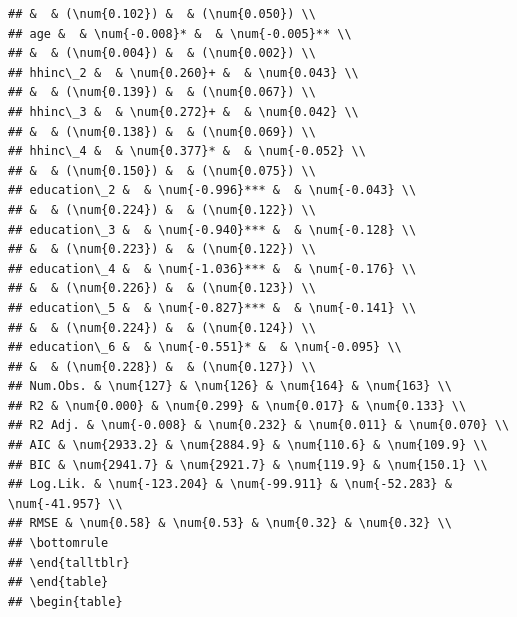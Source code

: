 \documentclass[
]{article}
\begin{document}
\begin{verbatim}
## &  & (\num{0.102}) &  & (\num{0.050}) \\
## age &  & \num{-0.008}* &  & \num{-0.005}** \\
## &  & (\num{0.004}) &  & (\num{0.002}) \\
## hhinc\_2 &  & \num{0.260}+ &  & \num{0.043} \\
## &  & (\num{0.139}) &  & (\num{0.067}) \\
## hhinc\_3 &  & \num{0.272}+ &  & \num{0.042} \\
## &  & (\num{0.138}) &  & (\num{0.069}) \\
## hhinc\_4 &  & \num{0.377}* &  & \num{-0.052} \\
## &  & (\num{0.150}) &  & (\num{0.075}) \\
## education\_2 &  & \num{-0.996}*** &  & \num{-0.043} \\
## &  & (\num{0.224}) &  & (\num{0.122}) \\
## education\_3 &  & \num{-0.940}*** &  & \num{-0.128} \\
## &  & (\num{0.223}) &  & (\num{0.122}) \\
## education\_4 &  & \num{-1.036}*** &  & \num{-0.176} \\
## &  & (\num{0.226}) &  & (\num{0.123}) \\
## education\_5 &  & \num{-0.827}*** &  & \num{-0.141} \\
## &  & (\num{0.224}) &  & (\num{0.124}) \\
## education\_6 &  & \num{-0.551}* &  & \num{-0.095} \\
## &  & (\num{0.228}) &  & (\num{0.127}) \\
## Num.Obs. & \num{127} & \num{126} & \num{164} & \num{163} \\
## R2 & \num{0.000} & \num{0.299} & \num{0.017} & \num{0.133} \\
## R2 Adj. & \num{-0.008} & \num{0.232} & \num{0.011} & \num{0.070} \\
## AIC & \num{2933.2} & \num{2884.9} & \num{110.6} & \num{109.9} \\
## BIC & \num{2941.7} & \num{2921.7} & \num{119.9} & \num{150.1} \\
## Log.Lik. & \num{-123.204} & \num{-99.911} & \num{-52.283} & \num{-41.957} \\
## RMSE & \num{0.58} & \num{0.53} & \num{0.32} & \num{0.32} \\
## \bottomrule
## \end{talltblr}
## \end{table} 
## \begin{table}

\end{verbatim}
\end{document}
